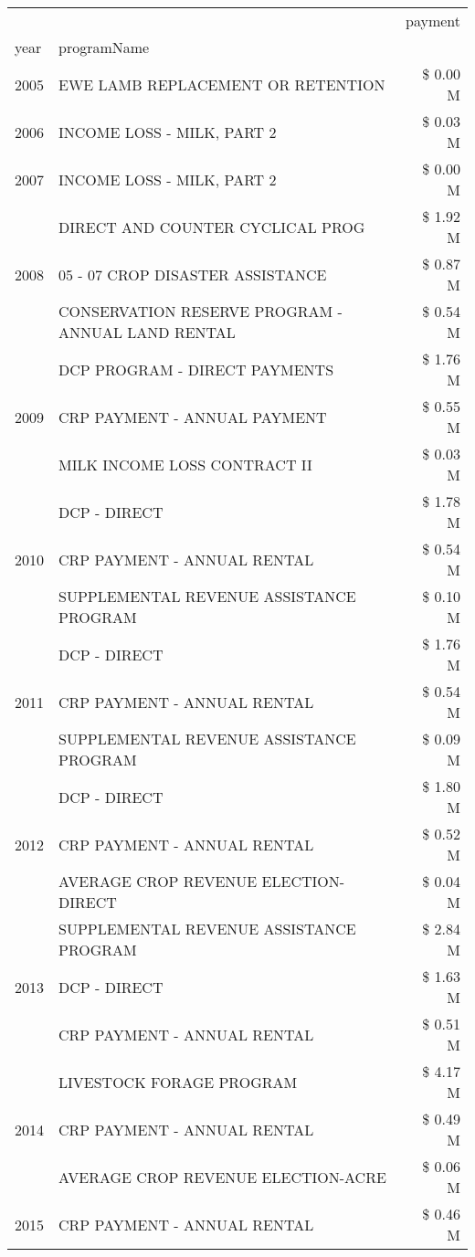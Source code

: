 \begin{tabular}{llr}
\toprule
 &  & payment \\
year & programName &  \\
\midrule
2005 & EWE LAMB REPLACEMENT OR RETENTION & \$ 0.00 M \\
\cline{1-3}
2006 & INCOME LOSS - MILK, PART 2 & \$ 0.03 M \\
\cline{1-3}
2007 & INCOME LOSS - MILK, PART 2 & \$ 0.00 M \\
\cline{1-3}
\multirow[t]{3}{*}{2008} & DIRECT AND COUNTER CYCLICAL PROG & \$ 1.92 M \\
 & 05 - 07 CROP DISASTER ASSISTANCE & \$ 0.87 M \\
 & CONSERVATION RESERVE PROGRAM - ANNUAL LAND RENTAL & \$ 0.54 M \\
\cline{1-3}
\multirow[t]{3}{*}{2009} & DCP PROGRAM - DIRECT PAYMENTS & \$ 1.76 M \\
 & CRP PAYMENT - ANNUAL PAYMENT & \$ 0.55 M \\
 & MILK INCOME LOSS CONTRACT II & \$ 0.03 M \\
\cline{1-3}
\multirow[t]{3}{*}{2010} & DCP - DIRECT & \$ 1.78 M \\
 & CRP PAYMENT - ANNUAL RENTAL & \$ 0.54 M \\
 & SUPPLEMENTAL REVENUE ASSISTANCE PROGRAM & \$ 0.10 M \\
\cline{1-3}
\multirow[t]{3}{*}{2011} & DCP - DIRECT & \$ 1.76 M \\
 & CRP PAYMENT - ANNUAL RENTAL & \$ 0.54 M \\
 & SUPPLEMENTAL REVENUE ASSISTANCE PROGRAM & \$ 0.09 M \\
\cline{1-3}
\multirow[t]{3}{*}{2012} & DCP - DIRECT & \$ 1.80 M \\
 & CRP PAYMENT - ANNUAL RENTAL & \$ 0.52 M \\
 & AVERAGE CROP REVENUE ELECTION-DIRECT & \$ 0.04 M \\
\cline{1-3}
\multirow[t]{3}{*}{2013} & SUPPLEMENTAL REVENUE ASSISTANCE PROGRAM & \$ 2.84 M \\
 & DCP - DIRECT & \$ 1.63 M \\
 & CRP PAYMENT - ANNUAL RENTAL & \$ 0.51 M \\
\cline{1-3}
\multirow[t]{3}{*}{2014} & LIVESTOCK FORAGE PROGRAM & \$ 4.17 M \\
 & CRP PAYMENT - ANNUAL RENTAL & \$ 0.49 M \\
 & AVERAGE CROP REVENUE ELECTION-ACRE & \$ 0.06 M \\
\cline{1-3}
\multirow[t]{3}{*}{2015} & CRP PAYMENT - ANNUAL RENTAL & \$ 0.46 M \\

\end{tabular}
